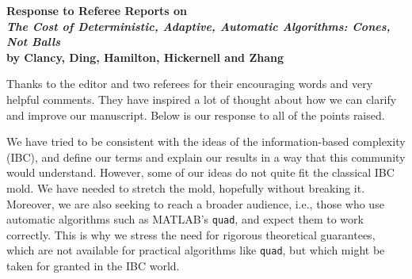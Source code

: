 \documentclass[11pt]{article}
\begin{document}
\begin{center}
{\bf Response to Referee Reports on \\[3ex]
{\Large \emph{The Cost of Deterministic, Adaptive, Automatic Algorithms:  Cones, Not Balls} \\[2ex] by Clancy, Ding, Hamilton, Hickernell and Zhang}}
\end{center}

\bigskip

Thanks to the editor and two referees for their encouraging words and very helpful comments.  They have inspired a lot of thought about how we can clarify and improve our manuscript.  Below is our response to all of the points raised.  

We have tried to be consistent with the ideas of the information-based complexity (IBC), and define our terms and explain our results in a way that this community would understand.  However, some of our ideas do not quite fit the classical IBC mold.  We have needed to stretch the mold, hopefully without breaking it.  Moreover, we are also seeking to reach a broader audience, i.e., those who use automatic algorithms such as MATLAB's {\tt quad}, and expect them to work correctly.  This is why we stress the need for rigorous theoretical guarantees, which are not available for practical algorithms like {\tt quad}, but which might be taken for granted in the IBC world.
\end{document}
